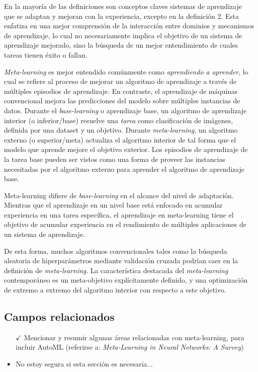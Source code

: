 En la mayoría de las definiciones son conceptos claves sistemas de aprendizaje que se adaptan y mejoran con la experiencia, excepto en la definición 2. Esta enfatiza en una mejor comprensión de la interacción entre dominios y mecanismos de aprendizaje, lo cual no necesariamente implica el objetivo de un sistema de aprendizaje mejorado, sino la búsqueda de un mejor entendimiento de cuales tareas tienen éxito o fallan.

\emph{Meta-learning} es mejor entendido comúnmente como \textit{aprendiendo a aprender}, lo cual se refiere al proceso de mejorar un algoritmo de aprendizaje a través de múltiples episodios de aprendizaje. En contraste, el aprendizaje de máquinas convencional mejora las predicciones del modelo sobre múltiples instancias de datos. Durante el \textit{base-learning} o aprendizaje base, un algoritmo de aprendizaje interior (o inferior/base) resuelve una \textit{tarea} como clasificación de imágenes, definida por una dataset y un objetivo. Durante \emph{meta-learning}, un algoritmo externo (o superior/meta) actualiza el algoritmo interior de tal forma que el modelo que aprende mejore el objetivo exterior. Los episodios de aprendizaje de la tarea base pueden ser vistos como una forma de proveer las instancias necesitadas por el algoritmo externo para aprender el algoritmo de aprendizaje base. 

Meta-learning difiere de \textit{base-learning} en el alcance del nivel de adaptación. Mientras que el aprendizaje en un nivel base está enfocado en acumular experiencia en una tarea específica, el aprendizaje en meta-learning tiene el objetivo de acumular experiencia en el rendimiento de múltiples aplicaciones de un sistema de aprendizaje.  

De esta forma, muchos algoritmos convencionales tales como la búsqueda aleatoria de hiperparámetros mediante validación cruzada podrían caer en la definición de \emph{meta-learning}. La característica destacada del \emph{meta-learning} contemporáneo es un meta-objetivo explícitamente definido, y una optimización de extremo a extremo del algoritmo interior con respecto a este objetivo.

\subsection{Campos relacionados}\label{subsec:mtl_related_fields}

\begin{itemize}
	\item[$\checkmark$] Mencionar y resumir algunas áreas relacionadas con meta-learning, para incluir AutoML (referirse a: \textit{Meta-Learning in Neural Networks: A Survey})
	\item No estoy segura si esta sección es necesaria...
\end{itemize}

